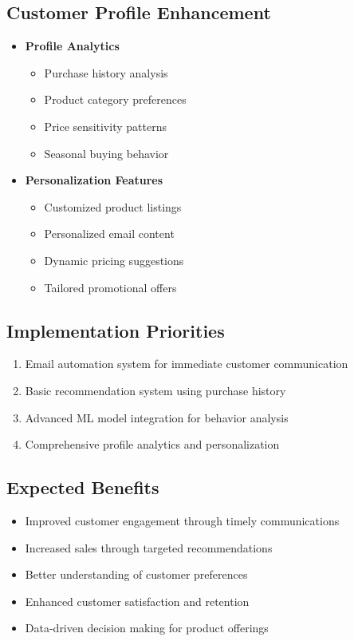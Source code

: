 \documentclass[12pt,a4paper]{article}
\begin{document}
\subsection{Customer Profile Enhancement}
\begin{itemize}
    \item \textbf{Profile Analytics}
    \begin{itemize}
        \item Purchase history analysis
        \item Product category preferences
        \item Price sensitivity patterns
        \item Seasonal buying behavior
    \end{itemize}
    
    \item \textbf{Personalization Features}
    \begin{itemize}
        \item Customized product listings
        \item Personalized email content
        \item Dynamic pricing suggestions
        \item Tailored promotional offers
    \end{itemize}
\end{itemize}

\subsection{Implementation Priorities}
\begin{enumerate}
    \item Email automation system for immediate customer communication
    \item Basic recommendation system using purchase history
    \item Advanced ML model integration for behavior analysis
    \item Comprehensive profile analytics and personalization
\end{enumerate}

\subsection{Expected Benefits}
\begin{itemize}
    \item Improved customer engagement through timely communications
    \item Increased sales through targeted recommendations
    \item Better understanding of customer preferences
    \item Enhanced customer satisfaction and retention
    \item Data-driven decision making for product offerings
\end{itemize}
\end{document}
